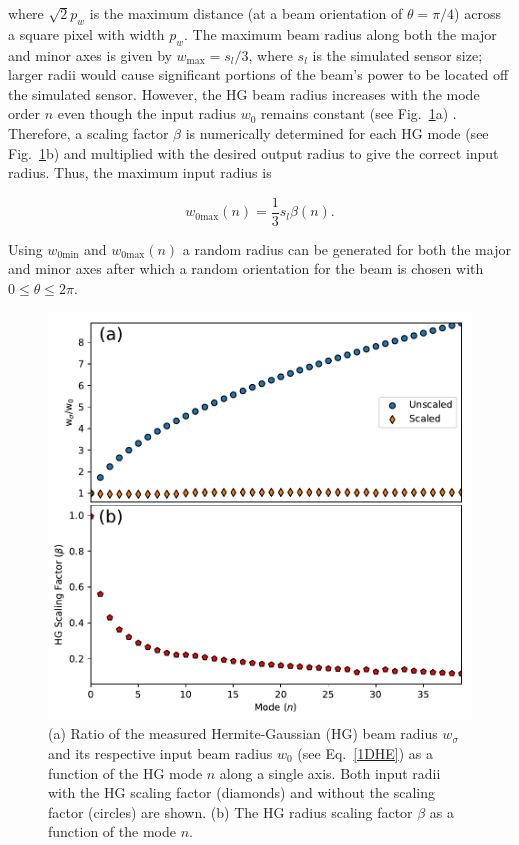 \documentclass[10pt,journal,compsoc]{IEEEtran}
\begin{document}
\noindent where $\sqrt{2}p_w$ is the maximum distance (at a beam orientation of $\theta=\pi/4$) across a square pixel with width $p_w$. The maximum beam radius along both the major and minor axes is given by $w_{\text{max}}=s_l/3$, where $s_l$ is the simulated sensor size; larger radii would cause significant portions of the beam's power to be located off the simulated sensor. However, the HG beam radius increases with the mode order $n$ even though the input radius $w_0$ remains constant (see Fig.~\ref{fig:scaling}a) \cite{lasers}. Therefore, a scaling factor $\beta$ is numerically determined for each HG mode (see Fig.~\ref{fig:scaling}b) and multiplied with the desired output radius to give the correct input radius. Thus, the maximum input radius is

\begin{equation}
w_{0\text{max}}(n)=\frac{1}{3}s_l\beta(n)\text{.}
\end{equation}

\noindent Using $w_{0\text{min}}$ and $w_{0\text{max}}(n)$ a random radius can be generated for both the major and minor axes after which a random orientation for the beam is chosen with $0\leq \theta \leq 2\pi$.

\begin{figure}
\centering %
\includegraphics[width=.5\textwidth]{scaling.pdf} %
\caption[Table of Contents Figure Caption]{ (a) Ratio of the measured Hermite-Gaussian (HG) beam radius $w_{\sigma}$ and its respective input beam radius $w_0$ (see Eq.~\ref{1DHE}) as a function of the HG mode $n$ along a single axis. Both input radii with the HG scaling factor (diamonds) and without the scaling factor (circles) are shown. (b) The HG radius scaling factor $\beta$ as a function of the mode $n$.} %
\label{fig:scaling} %
\end{figure}
\end{document}
